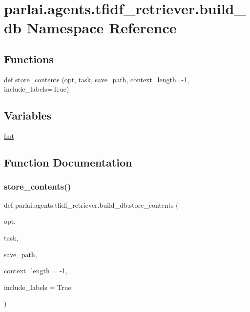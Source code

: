 \hypertarget{namespaceparlai_1_1agents_1_1tfidf__retriever_1_1build__db}{}\section{parlai.\+agents.\+tfidf\+\_\+retriever.\+build\+\_\+db Namespace Reference}
\label{namespaceparlai_1_1agents_1_1tfidf__retriever_1_1build__db}
\subsection*{Functions}
\begin{DoxyCompactItemize}
\item 
def \hyperlink{namespaceparlai_1_1agents_1_1tfidf__retriever_1_1build__db_a794fe63c76c7ac42ca1ac1b18c2528f4}{store\+\_\+contents} (opt, task, save\+\_\+path, context\+\_\+length=-\/1, include\+\_\+labels=True)
\end{DoxyCompactItemize}
\subsection*{Variables}
\begin{DoxyCompactItemize}
\item 
\hyperlink{namespaceparlai_1_1agents_1_1tfidf__retriever_1_1build__db_a1a9f39c829811f3714a126cb1a5ca48f}{fmt}
\end{DoxyCompactItemize}


\subsection{Function Documentation}
\mbox{\label{namespaceparlai_1_1agents_1_1tfidf__retriever_1_1build__db_a794fe63c76c7ac42ca1ac1b18c2528f4}} 
\subsubsection{\texorpdfstring{store\+\_\+contents()}{store\_contents()}}
{\footnotesize\ttfamily def parlai.\+agents.\+tfidf\+\_\+retriever.\+build\+\_\+db.\+store\+\_\+contents (\begin{DoxyParamCaption}\item[{}]{opt,  }\item[{}]{task,  }\item[{}]{save\+\_\+path,  }\item[{}]{context\+\_\+length = {\ttfamily -\/1},  }\item[{}]{include\+\_\+labels = {\ttfamily True} }\end{DoxyParamCaption})}

